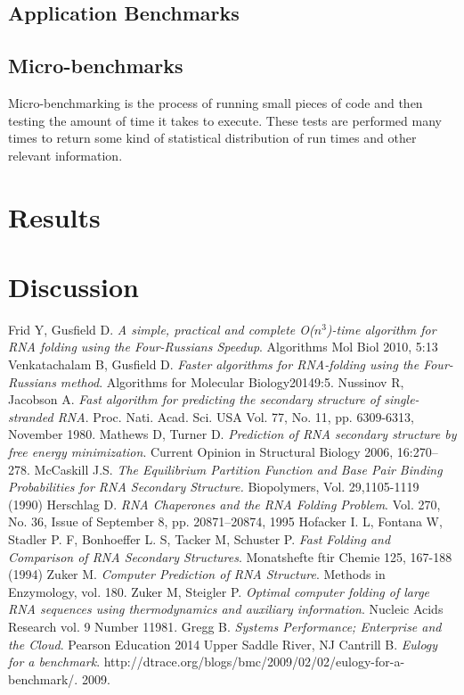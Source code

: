 \documentclass[12pt]{article}
\begin{document}
\subsection{Application Benchmarks}

\subsection{Micro-benchmarks}
\par Micro-benchmarking is the process of running small pieces of code and then testing the amount of time it takes to execute. These tests are performed many times to return some kind of statistical distribution of run times and other relevant information.
\section{Results}

\section{Discussion}
\begin{thebibliography}{56}
Frid Y, Gusfield D.
\textit{A simple, practical and complete O($n^3$)-time
algorithm for RNA folding using the Four-Russians Speedup}.
Algorithms Mol Biol 2010, 5:13
Venkatachalam B, Gusfield D.
\textit{Faster algorithms for RNA-folding using the Four-Russians method}.
Algorithms for Molecular Biology20149:5.
Nussinov R, Jacobson A.
\textit{Fast algorithm for predicting the secondary structure of
single-stranded RNA}.
Proc. Nati. Acad. Sci. USA Vol. 77, No. 11, pp. 6309-6313, November 1980.
Mathews D, Turner D.
\textit{Prediction of RNA secondary structure by free energy
minimization}.
Current Opinion in Structural Biology 2006, 16:270–278.
McCaskill J.S.
\textit{The Equilibrium Partition Function and Base Pair
Binding Probabilities for RNA Secondary Structure.}
Biopolymers, Vol. 29,1105-1119 (1990)
Herschlag D.
\textit{RNA Chaperones and the RNA Folding Problem}.
Vol. 270, No. 36, Issue of September 8, pp. 20871–20874, 1995
Hofacker I. L, Fontana W, Stadler P. F, Bonhoeffer L. S, Tacker M, Schuster P.
\textit{Fast Folding and Comparison of RNA Secondary Structures}.
Monatshefte ftir Chemie 125, 167-188 (1994)
Zuker M.
\textit{Computer Prediction of RNA Structure}.
Methods in Enzymology, vol. 180.
Zuker M, Steigler P.
\textit{Optimal computer folding of large RNA sequences using thermodynamics and auxiliary information}.
Nucleic Acids Research vol. 9 Number 11981.
Gregg B.
\textit{Systems Performance; Enterprise and the Cloud}.
Pearson Education 2014 Upper Saddle River, NJ
Cantrill B.
\textit{Eulogy for a benchmark}.
http://dtrace.org/blogs/bmc/2009/02/02/eulogy-for-a-benchmark/.
2009.
\end{thebibliography}
\end{document}
